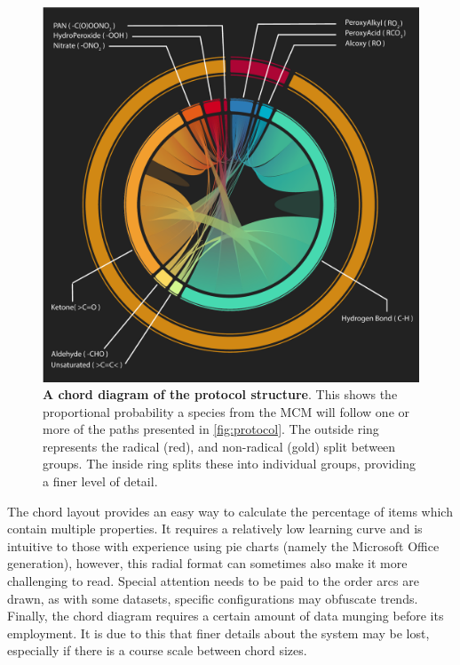 \begin{figure}[H]
     \centering
     \includegraphics[width=\textwidth]{figures_c1/radicallayermcmgen.pdf}

        \caption{\textbf{A chord diagram of the protocol structure}. This shows the proportional probability a species from the MCM will follow one or more of the paths presented in \autoref{fig:protocol}. The outside ring represents the radical (red), and non-radical (gold) split between groups. The inside ring splits these into individual groups, providing a finer level of detail. }
        \label{fig:chord}
\end{figure}


The chord layout provides an easy way to calculate the percentage of items which contain multiple properties. It requires a relatively low learning curve and is intuitive to those with experience using pie charts (namely the Microsoft Office generation), however, this radial format can sometimes also make it more challenging to read. Special attention needs to be paid to the order arcs are drawn, as with some datasets, specific configurations may obfuscate trends. Finally, the chord diagram requires a certain amount of data munging before its employment. It is due to this that finer details about the system may be lost, especially if there is a course scale between chord sizes.












